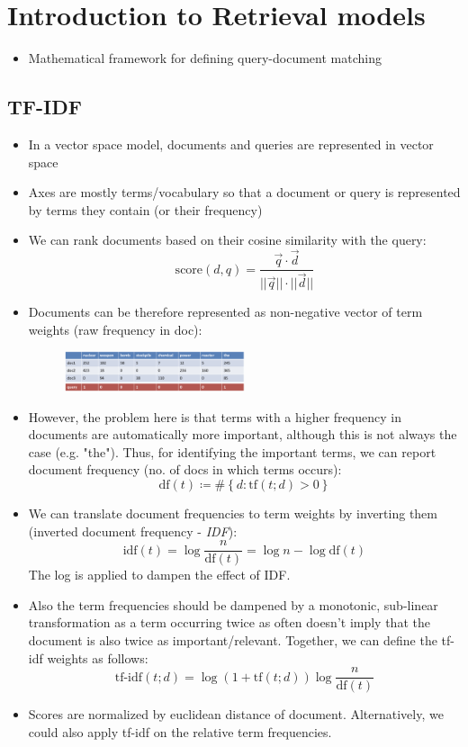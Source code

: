 \section{Introduction to Retrieval models}
\begin{itemize}
	\item Mathematical framework for defining query-document matching
\end{itemize}
\subsection{TF-IDF}
\begin{itemize}
	\item In a vector space model, documents and queries are represented in vector space
	\item Axes are mostly terms/vocabulary so that a document or query is represented by terms they contain (or their frequency)
	\item We can rank documents based on their cosine similarity with the query:
	$$\text{score}(d,q) = \frac{\vec{q} \cdot \vec{d}}{||\vec{q}||\cdot ||\vec{d}||}$$
	\item Documents can be therefore represented as non-negative vector of term weights (raw frequency in doc):
	\begin{figure}[ht]
		\centering
		\includegraphics[width=0.5\textwidth]{figures/language_models_tf_example.png}
		\label{img:language_models_tf_example}
	\end{figure}
	\item However, the problem here is that terms with a higher frequency in documents are automatically more important, although this is not always the case (e.g. "the"). Thus, for identifying the important terms, we can report document frequency (no. of docs in which terms occurs):
	$$\text{df}(t) \coloneqq \#\left\{d:\text{tf}(t;d)>0\right\}$$
	\item We can translate document frequencies to term weights by inverting them (inverted document frequency - \textit{IDF}):
	$$\text{idf}(t) = \log \frac{n}{\text{df}(t)} = \log n - \log \text{df}(t)$$
	The log is applied to dampen the effect of IDF.
	\item Also the term frequencies should be dampened by a monotonic, sub-linear transformation as a term occurring twice as often doesn't imply that the document is also twice as important/relevant. Together, we can define the tf-idf weights as follows:
	$$\text{tf-idf}(t;d) = \log \left(1+\text{tf}(t;d)\right) \log \frac{n}{\text{df}(t)}$$
	\item Scores are normalized by euclidean distance of document. Alternatively, we could also apply tf-idf on the relative term frequencies.
\end{itemize}
